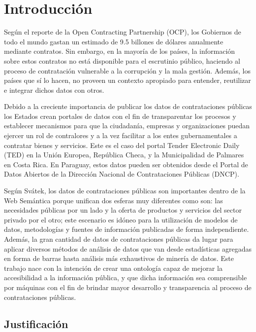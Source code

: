 \chapter{Introducción}
Según el reporte de la Open Contracting Partnership (OCP), los Gobiernos de todo el mundo gastan un estimado de 9.5 billones de dólares anualmente mediante contratos. Sin embargo, en la mayoría de los países, la información sobre estos contratos no está disponible para el escrutinio público, haciendo al proceso de contratación vulnerable a la corrupción y la mala gestión. Además, los países que sí lo hacen, no proveen un contexto apropiado para entender, reutilizar e integrar dichos datos con otros.

Debido a la creciente importancia de publicar los datos de contrataciones públicas  los Estados crean portales de datos con el fin de transparentar los procesos y establecer mecanismos para que la ciudadanía, empresas y organizaciones puedan ejercer un rol de contralores y a la vez facilitar a los entes gubernamentales a contratar bienes y servicios. Este es el caso del portal Tender Electronic Daily (TED) en la Unión Europea, República Checa, y la Municipalidad de Palmares en Costa Rica. En Paraguay, estos datos pueden ser obtenidos desde el Portal de Datos Abiertos de la Dirección Nacional de Contrataciones Públicas (DNCP).

Según Svátek, los datos de contrataciones públicas son importantes dentro de la Web Semántica porque unifican dos esferas muy diferentes como son: las necesidades públicas por un lado y la oferta de productos y servicios del sector privado por el otro; este escenario es idóneo para la utilización de modelos de datos, metodologías y fuentes de información publicadas de forma independiente. Además, la gran cantidad de datos de contrataciones públicas da lugar para aplicar diversos métodos de análisis de datos que van desde estadísticas agregadas en forma de barras hasta análisis más exhaustivos de minería de datos.
Este trabajo nace con la intención de crear una ontología capaz de mejorar la accesibilidad a la información pública, y que dicha información sea comprensible por máquinas con el fin de brindar mayor desarrollo y transparencia al proceso de contrataciones públicas.



\section{Justificación}

